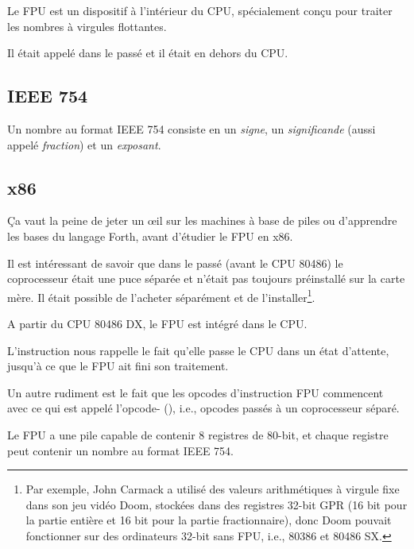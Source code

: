 ﻿\mysection{\FPUChapterName}
\label{sec:FPU}

Le \ac{FPU} est un dispositif à l'intérieur du \ac{CPU}, spécialement conçu pour
traiter les nombres à virgules flottantes.

Il était appelé  dans le passé et il était en dehors du \ac{CPU}.

\subsection{IEEE 754}

Un nombre au format IEEE 754 consiste en un \emph{signe}, un \emph{significande} (aussi
appelé \emph{fraction}) et un \emph{exposant}.

\subsection{x86}

Ça vaut la peine de jeter un \oe{}il sur les machines à base de piles ou
d'apprendre les bases du langage Forth, avant d'étudier le \ac{FPU} en
x86.

Il est intéressant de savoir que dans le passé (avant le CPU 80486) le coprocesseur
était une puce séparée et n'était pas toujours préinstallé sur la carte mère. Il
était possible de l'acheter séparément et de l'installer\footnote{Par exemple, John
Carmack a utilisé des valeurs arithmétiques à virgule fixe
dans son jeu vidéo Doom, stockées dans des registres 32-bit \ac{GPR} (16 bit pour
la partie entière et 16 bit pour la partie fractionnaire), donc Doom pouvait fonctionner
sur des ordinateurs 32-bit sans FPU, i.e., 80386 et 80486 SX.}.

A partir du CPU 80486 DX, le \ac{FPU} est intégré dans le \ac{CPU}.

L'instruction  nous rappelle le fait qu'elle passe le \ac{CPU} dans un
état d'attente, jusqu'à ce que le \ac{FPU} ait fini son traitement.

Un autre rudiment est le fait que les opcodes d'instruction \ac{FPU} commencent
avec ce qui est appelé l'opcode- (), i.e., opcodes
passés à un coprocesseur séparé.

\label{FPU_is_stack}

Le FPU a une pile capable de contenir 8 registres de 80-bit, et chaque registre peut
contenir un nombre au format IEEE 754.

